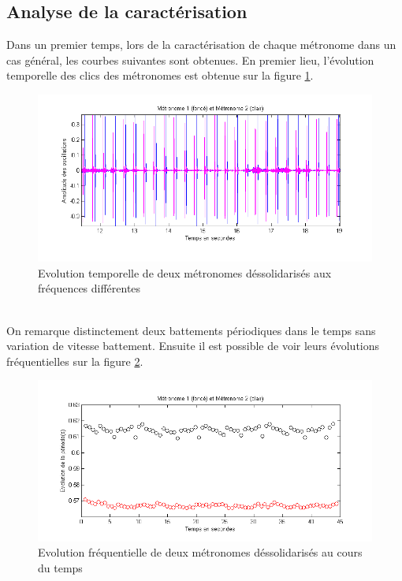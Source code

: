 \documentclass[a4paper,11pt]{report}
\begin{document}
\subsection{Analyse de la caractérisation}
Dans un premier temps, lors de la caractérisation de chaque métronome dans un cas général, les courbes suivantes sont obtenues. En premier lieu, l'évolution temporelle des clics des métronomes est obtenue sur la figure \ref{CaractérisationT}.
\begin{figure}[h]
\centering
\includegraphics[width=1\textwidth]{Caracterisation_temporelle_200BPM}
\caption{Evolution temporelle de deux métronomes déssolidarisés aux fréquences différentes}\label{CaractérisationT}
\end{figure}\\

On remarque distinctement deux battements périodiques dans le temps sans variation de vitesse battement. Ensuite il est possible de voir leurs évolutions fréquentielles sur la figure \ref{CaractérisationF}.
\begin{figure}[h]
\centering
\includegraphics[width=1\textwidth]{Caracterisation_Frequence_200BPM}
\caption{Evolution fréquentielle de deux métronomes déssolidarisés au cours du temps}\label{CaractérisationF}
\end{figure}\\
\end{document}
